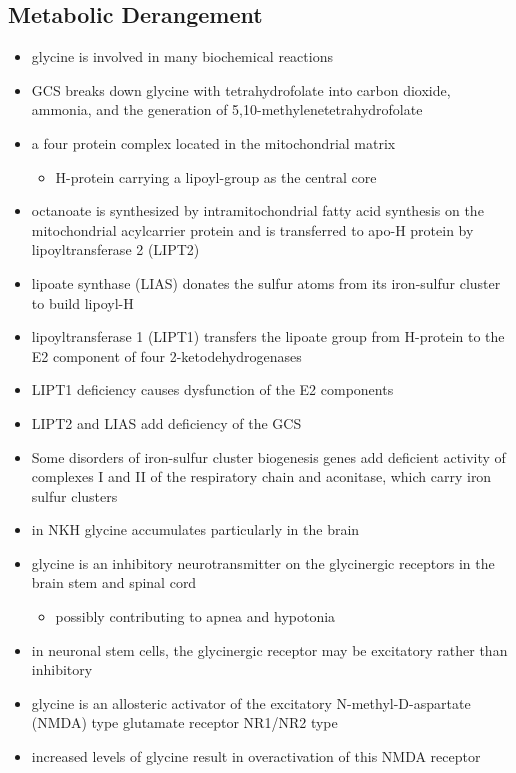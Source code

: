 \documentclass{scrartcl}
\begin{document}
\subsection{Metabolic Derangement}
\label{sec:org5afb5ac}
\begin{itemize}
\item glycine is involved in many biochemical reactions
\item GCS breaks down glycine with tetrahydrofolate into carbon dioxide,
ammonia, and the generation of 5,10-methylenetetrahydrofolate
\item a four protein complex located in the mitochondrial matrix
\begin{itemize}
\item H-protein carrying a lipoyl-group as the central core
\end{itemize}
\item octanoate is synthesized by intramitochondrial fatty acid synthesis
on the mitochondrial acylcarrier protein and is transferred to apo-H
protein by lipoyltransferase 2 (LIPT2)
\item lipoate synthase (LIAS) donates the sulfur atoms from its
iron-sulfur cluster to build lipoyl-H
\item lipoyltransferase 1 (LIPT1) transfers the lipoate group from
H-protein to the E2 component of four 2-ketodehydrogenases
\item LIPT1 deficiency causes dysfunction of the E2 components
\item LIPT2 and LIAS add deficiency of the GCS
\item Some disorders of iron-sulfur cluster biogenesis genes add deficient
activity of complexes I and II of the respiratory chain and
aconitase, which carry iron sulfur clusters
\item in NKH glycine accumulates particularly in the brain
\item glycine is an inhibitory neurotransmitter on the glycinergic
receptors in the brain stem and spinal cord
\begin{itemize}
\item possibly contributing to apnea and hypotonia
\end{itemize}
\item in neuronal stem cells, the glycinergic receptor may be excitatory
rather than inhibitory
\item glycine is an allosteric activator of the excitatory
N-methyl-D-aspartate (NMDA) type glutamate receptor NR1/NR2 type
\item increased levels of glycine result in overactivation of this NMDA
receptor
\end{itemize}
\end{document}
